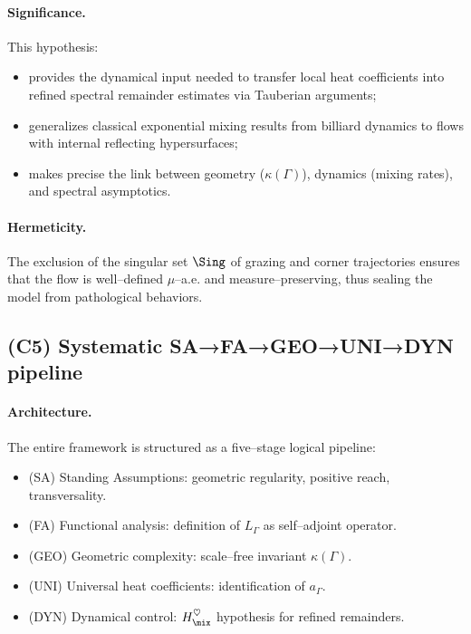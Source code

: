 \paragraph{Significance.}
This hypothesis:
\begin{itemize}
  \item provides the dynamical input needed to transfer local heat coefficients 
        into refined spectral remainder estimates via Tauberian arguments;
  \item generalizes classical exponential mixing results from billiard dynamics 
        to flows with internal reflecting hypersurfaces;
  \item makes precise the link between geometry ($\kappa(\Gamma)$), 
        dynamics (mixing rates), and spectral asymptotics.
\end{itemize}

\paragraph{Hermeticity.}
The exclusion of the singular set $\Sing$ of grazing and corner trajectories 
ensures that the flow is well–defined $\mu$–a.e. and measure–preserving, 
thus sealing the model from pathological behaviors. 

\subsection{(C5) Systematic SA→FA→GEO→UNI→DYN pipeline}

\paragraph{Architecture.}
The entire framework is structured as a five–stage logical pipeline:
\begin{itemize}
  \item (SA) Standing Assumptions: geometric regularity, positive reach, transversality.
  \item (FA) Functional analysis: definition of $L_\Gamma$ as self–adjoint operator.
  \item (GEO) Geometric complexity: scale–free invariant $\kappa(\Gamma)$.
  \item (UNI) Universal heat coefficients: identification of $a_\Gamma$.
  \item (DYN) Dynamical control: $H_{\mix}^\heartsuit$ hypothesis for refined remainders.
\end{itemize}

